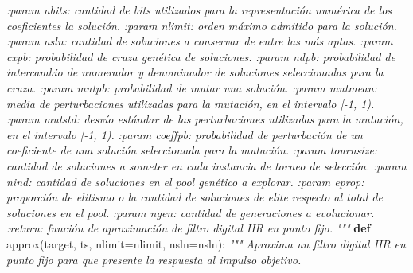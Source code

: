 \documentclass[11pt]{article}
\newenvironment{Shaded}{}{}
\newcommand{\KeywordTok}[1]{\textcolor[rgb]{0.00,0.44,0.13}{\textbf{{#1}}}}
\newcommand{\CommentTok}[1]{\textcolor[rgb]{0.38,0.63,0.69}{\textit{{#1}}}}
\newcommand{\NormalTok}[1]{{#1}}
\newcommand{\OperatorTok}[1]{\textcolor[rgb]{0.40,0.40,0.40}{{#1}}}
\begin{document}
\begin{Shaded}
\begin{Highlighting}[]
{\CommentTok{    :param nbits: cantidad de bits utilizados para la representación numérica}
\CommentTok{      de los coeficientes la solución.}
\CommentTok{    :param nlimit: orden máximo admitido para la solución.}
\CommentTok{    :param nsln: cantidad de soluciones a conservar de entre las más aptas.}
\CommentTok{    :param cxpb: probabilidad de cruza genética de soluciones.}
\CommentTok{    :param ndpb: probabilidad de intercambio de numerador y denominador}
\CommentTok{      de soluciones seleccionadas para la cruza.}
\CommentTok{    :param mutpb: probabilidad de mutar una solución.}
\CommentTok{    :param mutmean: media de perturbaciones utilizadas para la mutación,}
\CommentTok{      en el intervalo [-1, 1).}
\CommentTok{    :param mutstd: desvío estándar de las perturbaciones utilizadas para}
\CommentTok{      la mutación, en el intervalo [-1, 1).}
\CommentTok{    :param coeffpb: probabilidad de perturbación de un coeficiente de}
\CommentTok{      una solución seleccionada para la mutación.}
\CommentTok{    :param tournsize: cantidad de soluciones a someter en cada instancia}
\CommentTok{      de torneo de selección.}
\CommentTok{    :param nind: cantidad de soluciones en el pool genético a explorar.}
\CommentTok{    :param eprop: proporción de elitismo o la cantidad de soluciones de elite}
\CommentTok{      respecto al total de soluciones en el pool.}
\CommentTok{    :param ngen: cantidad de generaciones a evolucionar.}
\CommentTok{    :return: función de aproximación de filtro digital IIR en punto fijo.}
\CommentTok{    """}
    \KeywordTok{def}\NormalTok{ approx(target, ts, nlimit}\OperatorTok{=}\NormalTok{nlimit, nsln}\OperatorTok{=}\NormalTok{nsln):}
        \CommentTok{"""}
\CommentTok{        Aproxima un filtro digital IIR en punto fijo para que presente la}
\CommentTok{        respuesta al impulso objetivo.}

}
\end{Highlighting}
\end{Shaded}
\end{document}

